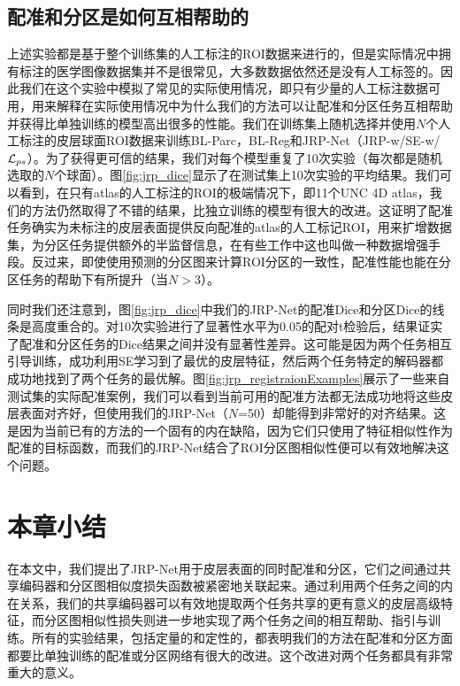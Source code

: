 \subsection{配准和分区是如何互相帮助的}
上述实验都是基于整个训练集的人工标注的ROI数据来进行的，但是实际情况中拥有标注的医学图像数据集并不是很常见，大多数数据依然还是没有人工标签的。因此我们在这个实验中模拟了常见的实际使用情况，即只有少量的人工标注数据可用，用来解释在实际使用情况中为什么我们的方法可以让配准和分区任务互相帮助并获得比单独训练的模型高出很多的性能。我们在训练集上随机选择并使用$N$个人工标注的皮层球面ROI数据来训练BL-Parc，BL-Reg和JRP-Net（JRP-w/SE-w/${\cal L}_{ps}$）。为了获得更可信的结果，我们对每个模型重复了10次实验（每次都是随机选取的$N$个球面）。图\ref{fig:jrp_dice}显示了在测试集上10次实验的平均结果。我们可以看到，在只有atlas的人工标注的ROI的极端情况下，即11个UNC 4D atlas\cite{li2015construction}，我们的方法仍然取得了不错的结果，比独立训练的模型有很大的改进。这证明了配准任务确实为未标注的皮层表面提供反向配准的atlas的人工标记ROI，用来扩增数据集，为分区任务提供额外的半监督信息，在有些工作\cite{xu2019deepatlas}中这也叫做一种数据增强手段。反过来，即使使用预测的分区图来计算ROI分区的一致性，配准性能也能在分区任务的帮助下有所提升（当$N>3$）。

同时我们还注意到，图\ref{fig:jrp_dice}中我们的JRP-Net的配准Dice和分区Dice的线条是高度重合的。对10次实验进行了显著性水平为0.05的配对t检验后，结果证实了配准和分区任务的Dice结果之间并没有显著性差异。这可能是因为两个任务相互引导训练，成功利用SE学习到了最优的皮层特征，然后两个任务特定的解码器都成功地找到了两个任务的最优解。图\ref{fig:jrp_registraionExamples}展示了一些来自测试集的实际配准案例，我们可以看到当前可用的配准方法都无法成功地将这些皮层表面对齐好，但使用我们的JRP-Net（$N$=50）却能得到非常好的对齐结果。这是因为当前已有的方法的一个固有的内在缺陷，因为它们只使用了特征相似性作为配准的目标函数，而我们的JRP-Net结合了ROI分区图相似性便可以有效地解决这个问题。

\section{本章小结}
在本文中，我们提出了JRP-Net用于皮层表面的同时配准和分区，它们之间通过共享编码器和分区图相似度损失函数被紧密地关联起来。通过利用两个任务之间的内在关系，我们的共享编码器可以有效地提取两个任务共享的更有意义的皮层高级特征，而分区图相似性损失则进一步地实现了两个任务之间的相互帮助、指引与训练。所有的实验结果，包括定量的和定性的，都表明我们的方法在配准和分区方面都要比单独训练的配准或分区网络有很大的改进。这个改进对两个任务都具有非常重大的意义。

